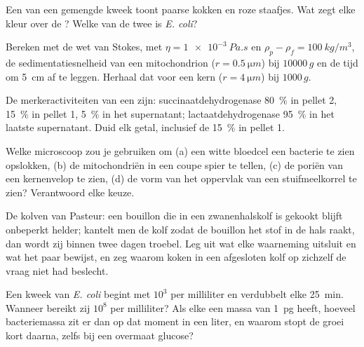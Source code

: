 \begin{exercise}[$\star\star$]\label{exo:b1:cell-unit-of-life:6}
Een  van een gemengde kweek toont paarse kokken en roze staafjes.
Wat zegt elke kleur over de ? Welke van de twee is \emph{E. coli}?
\end{exercise}

\begin{exercise}[$\star\star$]\label{exo:b1:cell-unit-of-life:7}
Bereken met de wet van Stokes, met $\eta = \qty{1e-3}{Pa.s}$ en $\rho_p - \rho_f =
\qty{100}{kg/m^3}$, de sedimentatiesnelheid van een mitochondrion
($r = \qty{0.5}{\micro m}$) bij $\num{10000}\,g$ en de tijd om \qty{5}{cm} af te
leggen. Herhaal dat voor een kern ($r = \qty{4}{\micro m}$) bij $1000\,g$.
\end{exercise}

\begin{exercise}[$\star\star$]\label{exo:b1:cell-unit-of-life:8}
De merkeractiviteiten van een  zijn: succinaatdehydrogenase
\qty{80}{\%} in pellet 2, \qty{15}{\%} in pellet 1, \qty{5}{\%} in het
supernatant; lactaatdehydrogenase \qty{95}{\%} in het laatste supernatant. Duid
elk getal, inclusief de \qty{15}{\%} in pellet 1.
\end{exercise}

\begin{exercise}[$\star\star$]\label{exo:b1:cell-unit-of-life:9}
Welke microscoop zou je gebruiken om (a) een witte bloedcel een bacterie te zien
opslokken, (b) de mitochondriën in een coupe spier te tellen, (c) de poriën van
een kernenvelop te zien, (d) de vorm van het oppervlak van een stuifmeelkorrel te
zien? Verantwoord elke keuze.
\end{exercise}

\begin{exercise}[$\star\star\star$]\label{exo:b1:cell-unit-of-life:10}
De kolven van Pasteur: een bouillon die in een zwanenhalskolf is gekookt blijft
onbeperkt helder; kantelt men de kolf zodat de bouillon het stof in de hals
raakt, dan wordt zij binnen twee dagen troebel. Leg uit wat elke waarneming
uitsluit en wat het paar bewijst, en zeg waarom koken in een afgesloten kolf op
zichzelf de vraag niet had beslecht.
\end{exercise}

\begin{exercise}[$\star\star\star$]\label{exo:b1:cell-unit-of-life:11}
Een kweek van \emph{E. coli} begint met $10^3$  per milliliter en
verdubbelt elke \qty{25}{min}. Wanneer bereikt zij $10^8$ per milliliter? Als
elke  een massa van \qty{1}{pg} heeft, hoeveel bacteriemassa zit er dan op dat
moment in een liter, en waarom stopt de groei kort daarna, zelfs bij een
overmaat glucose?
\end{exercise}

